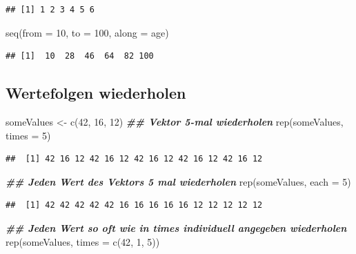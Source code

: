 \documentclass[
]{book}
\newenvironment{Shaded}{\begin{snugshade}}{\end{snugshade}}
\newcommand{\AttributeTok}[1]{\textcolor[rgb]{0.77,0.63,0.00}{#1}}
\newcommand{\DecValTok}[1]{\textcolor[rgb]{0.00,0.00,0.81}{#1}}
\newcommand{\DocumentationTok}[1]{\textcolor[rgb]{0.56,0.35,0.01}{\textbf{\textit{#1}}}}
\newcommand{\FunctionTok}[1]{\textcolor[rgb]{0.00,0.00,0.00}{#1}}
\newcommand{\NormalTok}[1]{#1}
\newcommand{\OtherTok}[1]{\textcolor[rgb]{0.56,0.35,0.01}{#1}}
\begin{document}
\begin{verbatim}
## [1] 1 2 3 4 5 6
\end{verbatim}

\begin{Shaded}
\begin{Highlighting}[]
\FunctionTok{seq}\NormalTok{(}\AttributeTok{from =} \DecValTok{10}\NormalTok{, }\AttributeTok{to =} \DecValTok{100}\NormalTok{, }\AttributeTok{along =}\NormalTok{ age)}
\end{Highlighting}
\end{Shaded}

\begin{verbatim}
## [1]  10  28  46  64  82 100
\end{verbatim}

\hypertarget{wertefolgen-wiederholen}{%
\subsection{Wertefolgen wiederholen}\label{wertefolgen-wiederholen}}

\begin{Shaded}
\begin{Highlighting}[]
\NormalTok{someValues }\OtherTok{\textless{}{-}} \FunctionTok{c}\NormalTok{(}\DecValTok{42}\NormalTok{, }\DecValTok{16}\NormalTok{, }\DecValTok{12}\NormalTok{)}
 \DocumentationTok{\#\# Vektor 5{-}mal wiederholen}
\FunctionTok{rep}\NormalTok{(someValues, }\AttributeTok{times =} \DecValTok{5}\NormalTok{)}
\end{Highlighting}
\end{Shaded}

\begin{verbatim}
##  [1] 42 16 12 42 16 12 42 16 12 42 16 12 42 16 12
\end{verbatim}

\begin{Shaded}
\begin{Highlighting}[]
 \DocumentationTok{\#\# Jeden Wert des Vektors 5 mal wiederholen}
\FunctionTok{rep}\NormalTok{(someValues, }\AttributeTok{each =} \DecValTok{5}\NormalTok{)}
\end{Highlighting}
\end{Shaded}

\begin{verbatim}
##  [1] 42 42 42 42 42 16 16 16 16 16 12 12 12 12 12
\end{verbatim}

\begin{Shaded}
\begin{Highlighting}[]
 \DocumentationTok{\#\# Jeden Wert so oft wie in times individuell angegeben wiederholen}
\FunctionTok{rep}\NormalTok{(someValues, }\AttributeTok{times =} \FunctionTok{c}\NormalTok{(}\DecValTok{42}\NormalTok{, }\DecValTok{1}\NormalTok{, }\DecValTok{5}\NormalTok{))}
\end{Highlighting}
\end{Shaded}
\end{document}
